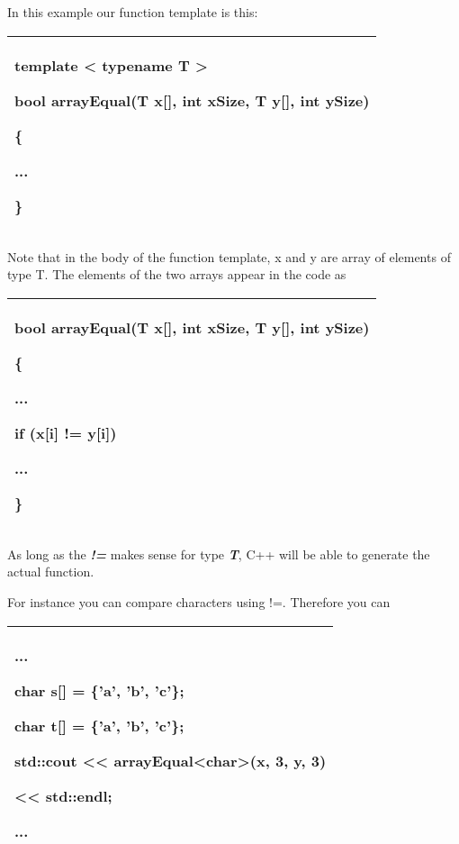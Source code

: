 \documentclass[
]{article}
\begin{document}
In this example our function template is this:

\begin{longtable}[]{@{}l@{}}
\toprule
\endhead
\begin{minipage}[t]{0.97\columnwidth}\raggedright
template \textless{} typename T \textgreater{}

bool arrayEqual(T x{[}{]}, int xSize, T y{[}{]}, int ySize)

\{

...

\}\strut
\end{minipage}\tabularnewline
\bottomrule
\end{longtable}

Note that in the body of the function template, x and y are array of
elements of type T. The elements of the two arrays appear in the code as

\begin{longtable}[]{@{}l@{}}
\toprule
\endhead
\begin{minipage}[t]{0.97\columnwidth}\raggedright
bool arrayEqual(T x{[}{]}, int xSize, T y{[}{]}, int ySize)

\{

...

\textbf{if (x{[}i{]} != y{[}i{]})}

...

\}\strut
\end{minipage}\tabularnewline
\bottomrule
\end{longtable}

As long as the \emph{\textbf{!=}} makes sense for type
\emph{\textbf{T}}, C++ will be able to generate the actual function.

For instance you can compare characters using !=. Therefore you can

\begin{longtable}[]{@{}l@{}}
\toprule
\endhead
\begin{minipage}[t]{0.97\columnwidth}\raggedright
...

\textbf{char} s{[}{]} = \{'a', 'b', 'c'\};

\textbf{char} t{[}{]} = \{'a', 'b', 'c'\};

std::cout \textless\textless{}
arrayEqual\textbf{\textless{}char\textgreater{}}(x, 3, y, 3)

\textless\textless{} std::endl;

...\strut
\end{minipage}\tabularnewline
\bottomrule
\end{longtable}
\end{document}

